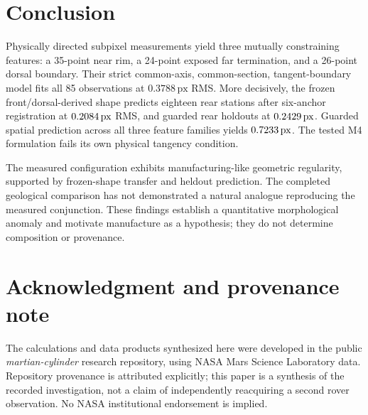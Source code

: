 \documentclass[11pt,letterpaper]{article}
\newcommand{\px}{\,\mathrm{px}}
\begin{document}
\section{Conclusion}

Physically directed subpixel measurements yield three mutually constraining features: a 35-point near rim, a 24-point exposed far termination, and a 26-point dorsal boundary. Their strict common-axis, common-section, tangent-boundary model fits all 85 observations at $0.3788\px$ RMS. More decisively, the frozen front/dorsal-derived shape predicts eighteen rear stations after six-anchor registration at $\SparseRearRMS\px$ RMS, and guarded rear holdouts at $\BlockedRearRMS\px$. Guarded spatial prediction across all three feature families yields $\BlockedJointRMS\px$. The tested M4 formulation fails its own physical tangency condition.

The measured configuration exhibits manufacturing-like geometric regularity, supported by frozen-shape transfer and heldout prediction. The completed geological comparison has not demonstrated a natural analogue reproducing the measured conjunction. These findings establish a quantitative morphological anomaly and motivate manufacture as a hypothesis; they do not determine composition or provenance.


\section*{Acknowledgment and provenance note}
The calculations and data products synthesized here were developed in the public \emph{martian-cylinder} research repository, using NASA Mars Science Laboratory data. Repository provenance is attributed explicitly; this paper is a synthesis of the recorded investigation, not a claim of independently reacquiring a second rover observation. No NASA institutional endorsement is implied.
\end{document}
